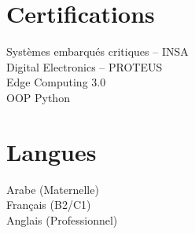 \documentclass[10pt,a4paper]{article}
\begin{document}
\begin{minipage}[t]{0.33\textwidth}
\section*{Certifications}

Systèmes embarqués critiques – INSA\\
Digital Electronics – PROTEUS\\
Edge Computing 3.0\\
OOP Python

\section*{Langues}

Arabe (Maternelle)\\
Français (B2/C1)\\
Anglais (Professionnel)

\end{minipage}
\end{document}
